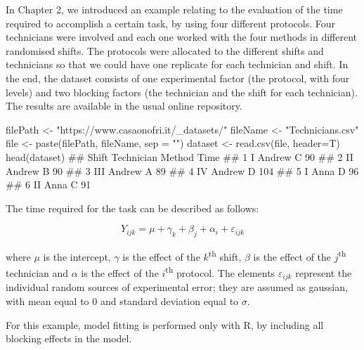 \documentclass[a4paper,12pt,oneside]{book}
\newenvironment{Shaded}{\begin{snugshade}}{\end{snugshade}}
\newcommand{\StringTok}[1]{#1}
\newcommand{\DocumentationTok}[1]{#1}
\newcommand{\OtherTok}[1]{#1}
\newcommand{\FunctionTok}[1]{#1}
\newcommand{\AttributeTok}[1]{#1}
\newcommand{\NormalTok}[1]{#1}
\begin{document}
In Chapter 2, we introduced an example relating to the evaluation of the time required to accomplish a certain task, by using four different protocols. Four technicians were involved and each one worked with the four methods in different randomised shifts. The protocols were allocated to the different shifts and technicians so that we could have one replicate for each technician and shift. In the end, the dataset consists of one experimental factor (the protocol, with four levels) and two blocking factors (the technician and the shift for each technician). The results are available in the usual online repository.

\begin{Shaded}
\begin{Highlighting}[]
\NormalTok{filePath }\OtherTok{\textless{}{-}} \StringTok{"https://www.casaonofri.it/\_datasets/"}
\NormalTok{fileName }\OtherTok{\textless{}{-}} \StringTok{"Technicians.csv"}
\NormalTok{file }\OtherTok{\textless{}{-}} \FunctionTok{paste}\NormalTok{(filePath, fileName, }\AttributeTok{sep =} \StringTok{""}\NormalTok{)}
\NormalTok{dataset }\OtherTok{\textless{}{-}} \FunctionTok{read.csv}\NormalTok{(file, }\AttributeTok{header=}\NormalTok{T)}
\FunctionTok{head}\NormalTok{(dataset)}
\DocumentationTok{\#\#   Shift Technician Method Time}
\DocumentationTok{\#\# 1     I     Andrew      C   90}
\DocumentationTok{\#\# 2    II     Andrew      B   90}
\DocumentationTok{\#\# 3   III     Andrew      A   89}
\DocumentationTok{\#\# 4    IV     Andrew      D  104}
\DocumentationTok{\#\# 5     I       Anna      D   96}
\DocumentationTok{\#\# 6    II       Anna      C   91}
\end{Highlighting}
\end{Shaded}

The time required for the task can be described as follows:

\[Y_{ijk} = \mu + \gamma_k + \beta_j + \alpha_i + \varepsilon_{ijk}\]

where \(\mu\) is the intercept, \(\gamma\) is the effect of the \(k\)\textsuperscript{th} shift, \(\beta\) is the effect of the \(j\)\textsuperscript{th} technician and \(\alpha\) is the effect of the \(i\)\textsuperscript{th} protocol. The elements \(\varepsilon_{ijk}\) represent the individual random sources of experimental error; they are assumed as gaussian, with mean equal to 0 and standard deviation equal to \(\sigma\).

For this example, model fitting is performed only with R, by including all blocking effects in the model.
\end{document}
